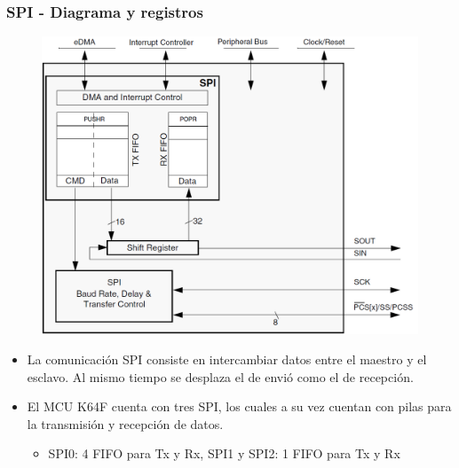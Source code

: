 \documentclass[10.5pt,scale=1.0,t,aspectratio=169,hyperref={pdfpagelabels=false}]{beamer}
\begin{document}
\begin{frame}
	\frametitle{SPI - Diagrama y registros}
	
	\begin{figure}
		\centering
		\includegraphics[scale=0.3]{12_SPIDiagram}
	\end{figure}
	
	\begin{itemize}
		\item La comunicación SPI consiste en intercambiar datos entre el maestro y el esclavo. Al mismo tiempo se desplaza el de envió como el de recepción.
		\item El MCU K64F cuenta con tres SPI, los cuales a su vez cuentan con pilas para la transmisión y recepción de datos. 
		\begin{itemize}
			\item SPI0: 4 FIFO para Tx y Rx, SPI1 y SPI2: 1 FIFO para Tx y Rx
		\end{itemize}
	\end{itemize}
\end{frame}
\end{document}
